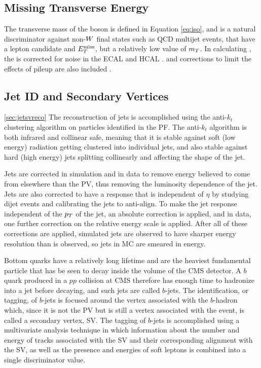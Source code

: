 \subsection{Missing Transverse Energy}

The transverse mass of the \w boson
 is defined in Equation \ref{eq:iso},
 and is a  natural discriminator against non-$W$ final states
 such as QCD multijet events,
 that have a lepton candidate and $E_T^{\mathrm{miss}}$,
 but a relatively low value of $m_T$.
In calculating \mt, the \met is corrected for noise in the
 ECAL and HCAL \cite{WZCMS:2010}.
 and corrections to limit the effects of
 pileup are also included \cite{CMS:8TeVMET}.

\subsection{Jet ID and Secondary Vertices}\ref{sec:jetsvreco}
 The reconstruction
  of jets is accomplished using the anti-$k_t$
  clustering algorithm on particles identified
  in the PF.
 The anti-$k_t$ algorithm is both infrared and collinear
  safe, meaning that it is stable against
  soft (low energy) radiation getting clustered into individual jets, and
  also stable against hard (high energy) jets splitting
  collinearly and affecting the shape of the jet.

 Jets are corrected in simulation and in data to remove
  energy believed to come from elsewhere than the PV,
  thus removing the luminosity dependence of the jet.
 Jets are also corrected to have a response that is
  independent of $\eta$ by studying dijet events
  and calibrating the jets to anti-align.
 To make the jet response independent of the $p_T$
  of the jet, an absolute correction is applied,
  and in data, one further correction on the relative
  energy scale is applied.
 After all of these corrections are applied,
  simulated jets are observed to have
  sharper energy resolution than is observed,
  so jets in MC are smeared in energy.

 Bottom quarks have a relatively long lifetime
  and are the heaviest fundamental particle
  that has be seen to decay inside the volume of the CMS detector.
 A $b$ quark produced in a $pp$ collision at CMS
  therefore has enough time to hadronize into a jet before
  decaying, and such jets are called $b$-jets.
 The identification, or tagging, of $b$-jets is focused around
  the vertex associated with the $b$-hadron which,
  since it is not the PV but is still a vertex associated
  with the event, is called a secondary vertex, SV.
 The tagging of $b$-jets is accomplished using a multivariate
  analysis technique in which information about
  the number and energy of tracks associated
  with the SV and their corresponding alignment
  with the SV, as well as the presence and energies of
  soft leptons is combined into a single discriminator value.



